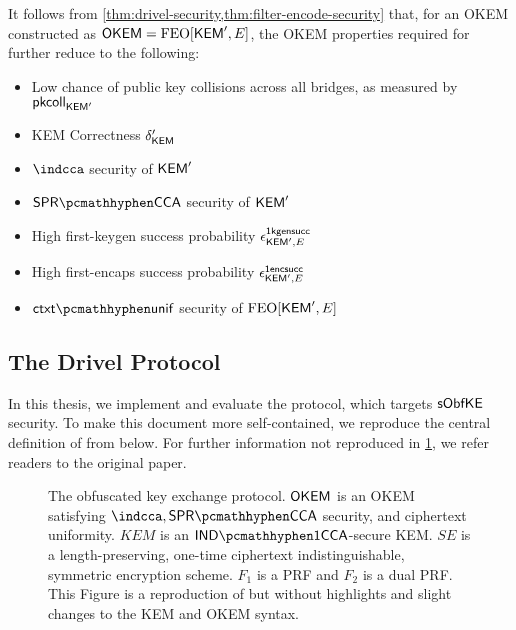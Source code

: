 \begin{corollary}
\label{cor:drivel-security-filter-encode}
    It follows from \cref{thm:drivel-security,thm:filter-encode-security} that, for an OKEM constructed as $\mathsf{OKEM} = \textsf{\textnormal{FEO}}[\mathsf{KEM}',E]$, the OKEM properties required for \drivel{} further reduce to the following:
    \begin{itemize}
        \item Low chance of public key collisions across all bridges, as measured by $\mathsf{pkcoll}_{\mathsf{KEM}'}$
        \item KEM Correctness $\delta_{\mathsf{KEM}}'$
        \item $\indcca$ security of $\mathsf{KEM}'$
        \item $\sprcca$ security of $\mathsf{KEM}'$
        \item High first-keygen success probability $\epsilon^{\mathsf{1kgensucc}}_{\mathsf{KEM}',E}$
        \item High first-encaps success probability $\epsilon^{\mathsf{1encsucc}}_{\mathsf{KEM}',E}$
        \item $\ctxtunif$ security of $\textsf{\textnormal{FEO}}[\mathsf{KEM}',E]$
    \end{itemize}
\end{corollary}

\subsection{The Drivel Protocol}

In this thesis, we implement and evaluate the \drivel{} protocol, which targets $\mathsf{sObfKE}$ security.
To make this document more self-contained, we reproduce the central definition of \drivel{} from \cite[Figure~6]{EPRINT:GRSV25} below.
For further information not reproduced in \cref{fig:drivel}, we refer readers to the original paper.

\begin{figure}
    
    \caption[
        The \drivel{} obfuscated key exchange protocol.
    ]{
        The \drivel{} obfuscated key exchange protocol.
        $\mathsf{OKEM}$ is an OKEM satisfying $\indcca, \sprcca$ security, and ciphertext uniformity.
        $KEM$ is an $\indonecca$-secure KEM.
        $SE$ is a length-preserving, one-time ciphertext indistinguishable, symmetric encryption scheme.
        $F_1$ is a PRF and $F_2$ is a dual PRF.
        This Figure is a reproduction of \cite[Figure~6]{EPRINT:GRSV25} but without highlights and slight changes to the KEM and OKEM syntax.
    }
    \label{fig:drivel}
\end{figure}